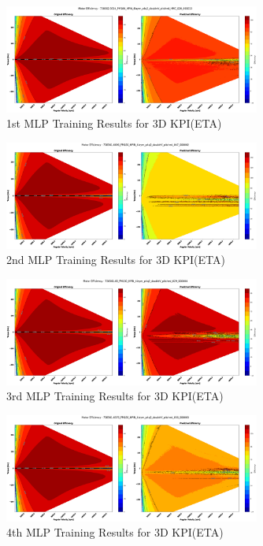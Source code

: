 \documentclass{report} %
\begin{document}
\begin{figure}[h]
    \centering
    \includegraphics[width=0.75\textwidth]{./ReportImages/KPI3Dprediction1.png} 
    \caption{1st MLP Training Results for 3D KPI(ETA)} 
    \label{fig:1st MLP Training Results for 3D KPI(ETA)}
\end{figure}

\begin{figure}[h]
    \centering
    \includegraphics[width=0.75\textwidth]{./ReportImages/KPI3Dprediction2.png} 
    \caption{2nd MLP Training Results for 3D KPI(ETA)} 
    \label{fig:2nd MLP Training Results for 3D KPI(ETA)}
\end{figure}

\begin{figure}[h]
    \centering
    \includegraphics[width=0.75\textwidth]{./ReportImages/KPI3Dprediction3.png} 
    \caption{3rd MLP Training Results for 3D KPI(ETA)} 
    \label{fig:3rd MLP Training Results for 3D KPI(ETA)}
\end{figure}

\begin{figure}[h]
    \centering
    \includegraphics[width=0.75\textwidth]{./ReportImages/KPI3Dprediction4.png} 
    \caption{4th MLP Training Results for 3D KPI(ETA)} 
    \label{fig:4th MLP Training Results for 3D KPI(ETA)}
\end{figure}
\end{document}
